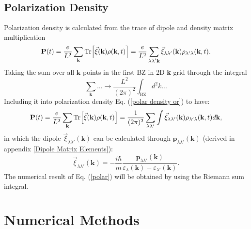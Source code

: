 \documentclass[12pt,english,a4paper]{article}
\begin{document}
\subsection{Polarization Density}
\quad Polarization density is calculated from the trace of dipole and density matrix multiplication
\begin{equation}
\label{polar density or}
\textbf{P}(t) = \frac{e}{L^2} \sum_{\textbf{k}}\Tr[\vec{\xi}(\textbf{k})\rho(\textbf{k},t)] = \frac{e}{L^2}\sum_{\substack{\lambda \lambda'\textbf{k}}} \vec{\xi}_{\lambda \lambda' }(\textbf{k})\rho_{\lambda' \lambda}(\textbf{k},t).
\end{equation}
\quad Taking the sum over all $\textbf{k}$-points in the first BZ in 2D \textbf{k}-grid through the integral
\begin{equation}
\sum_{\textbf{k}}... \to \frac{L^2}{(2\pi)^2}\int_{\mathrm{BZ}} d^2 k...
\end{equation}
\quad Including it into polarization density Eq. (\ref{polar density or}) to have:
\begin{equation}
	\label{polar}
\textbf{P}(t) = \frac{e}{L^2} \sum_{\textbf{k}} \Tr[\vec{\xi} (\textbf{k}) \rho(\textbf{k},t)] = \frac{1}{(2\pi)^2} \sum_{\lambda\lambda'}	\int \vec{\xi}_{\lambda \lambda'} (\textbf{k}) \rho_{\lambda'\lambda}(\textbf{k},t)d\textbf{k},
\end{equation}
in which the dipole $\vec{\xi}_{\lambda \lambda'}(\textbf{k})$ can be calculated through $\textbf{p}_{\lambda \lambda'}(\textbf{k})$ (derived in appendix \ref{Dipole Matrix Elements}):
\begin{equation}
	\vec{\xi}_{\lambda \lambda'} (\textbf{k}) = -\frac{i\hbar }{m} \frac{\textbf{p}_{\lambda \lambda'}(\textbf{k})}{\varepsilon_{\lambda}(\textbf{k}) - \varepsilon_{\lambda'}(\textbf{k})}.
\end{equation}
\quad The numerical result of Eq. (\ref{polar}) will be obtained by using the Riemann sum integral.
\newpage
\section{Numerical Methods}
\end{document}
